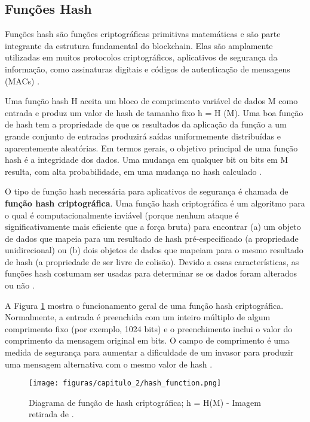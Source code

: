     \subsection{Funções Hash}
        
        Funções hash são funções criptográficas primitivas matemáticas e são parte integrante da estrutura fundamental do blockchain. Elas são amplamente utilizadas em muitos protocolos criptográficos, aplicativos de segurança da informação, como assinaturas digitais e códigos de autenticação de mensagens (MACs)  \cite{beginnig_blockchain_bikramaditya}.
        
        Uma função hash H aceita um bloco de comprimento variável de dados M como entrada e produz um valor de hash de tamanho fixo h = H (M). Uma boa função de hash tem a propriedade de que os resultados da aplicação da função a um grande conjunto de entradas produzirá saídas uniformemente distribuídas e aparentemente aleatórias. Em termos gerais, o objetivo principal de uma função hash é a integridade dos dados. Uma mudança em qualquer bit ou bits em M resulta, com alta probabilidade, em uma mudança no hash calculado \cite{cryptograpy_and_network_stallings}.
        
        O tipo de função hash necessária para aplicativos de segurança é chamada de \textbf{função hash criptográfica}. Uma função hash criptográfica é um algoritmo para o qual é computacionalmente inviável (porque nenhum ataque é significativamente mais eficiente que a força bruta) para encontrar (a) um objeto de dados que mapeia para um resultado de hash pré-especificado (a propriedade unidirecional) ou (b) dois objetos de dados que mapeiam para o mesmo resultado de hash (a propriedade de ser livre de colisão). Devido a essas características, as funções hash costumam ser usadas para determinar se os dados foram alterados ou não \cite{cryptograpy_and_network_stallings}.

        A Figura \ref{fig:hash_function} mostra o funcionamento geral de uma função hash criptográfica. Normalmente, a entrada é preenchida com um inteiro múltiplo de algum comprimento fixo (por exemplo, 1024 bits) e o preenchimento inclui o valor do comprimento da mensagem original em bits. O campo de comprimento é uma medida de segurança para aumentar a dificuldade de um invasor para produzir uma mensagem alternativa com o mesmo valor de hash \cite{cryptograpy_and_network_stallings}.
    
                \begin{figure}[h]
                     \centering
                     \texttt{[image: figuras/capitulo\_2/hash\_function.png]}
                     \caption{Diagrama de função de hash criptográfica; h = H(M) - Imagem retirada de \cite{cryptograpy_and_network_stallings}.}
                     \label{fig:hash_function}
                \end{figure}
                
